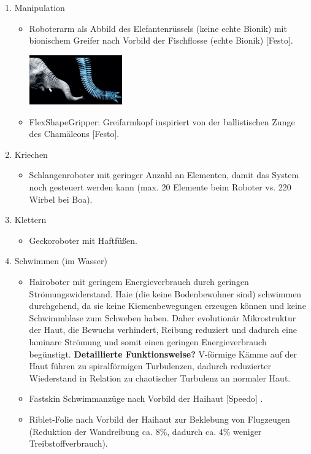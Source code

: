 \begin{enumerate}
    \item Manipulation
    \begin{itemize}
        \item Roboterarm als Abbild des Elefantenrüssels (keine echte Bionik) mit bionischem Greifer nach Vorbild der Fischflosse (echte Bionik) [Festo].
        \begin{center}
            \includegraphics[width=4cm]{lec9/figures/elefant.png}
        \end{center}
        \item FlexShapeGripper: Greifarmkopf inspiriert von der ballistischen Zunge des Chamäleons [Festo].
    \end{itemize}
    \item Kriechen
    \begin{itemize}
        \item Schlangenroboter mit geringer Anzahl an Elementen, damit das System noch gesteuert werden kann (max. 20 Elemente beim Roboter vs. 220 Wirbel bei Boa).
    \end{itemize}
    \item Klettern
    \begin{itemize}
        \item Geckoroboter mit Haftfüßen.
    \end{itemize}
    \item Schwimmen (im Wasser)
    \begin{itemize}
        \item Hairoboter mit geringem Energieverbrauch durch geringen Strömungswiderstand. Haie (die keine Bodenbewohner sind) schwimmen durchgehend, da sie keine Kiemenbewegungen erzeugen können und keine Schwimmblase zum Schweben haben. Daher evolutionär Mikrostruktur der Haut, die Bewuchs verhindert, Reibung reduziert und dadurch eine laminare Strömung und somit einen geringen Energieverbrauch begünstigt. \textbf{\dangersign Detaillierte Funktionsweise?} V-förmige Kämme auf der Haut führen zu spiralförmigen Turbulenzen, dadurch reduzierter Wiederstand in Relation zu chaotischer Turbulenz an normaler Haut. 
        \item Fastskin Schwimmanzüge nach Vorbild der Haihaut [Speedo] .
        \item Riblet-Folie nach Vorbild der Haihaut zur Beklebung von Flugzeugen (Reduktion der Wandreibung ca. 8\%, dadurch ca. 4\% weniger Treibstoffverbrauch).

\end{itemize}
\end{enumerate}
